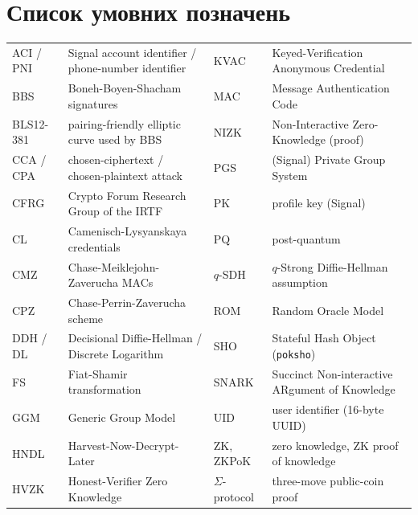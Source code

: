 \documentclass{article}
\begin{document}
\section*{Список умовних позначень}
{}
\begingroup
\small
\renewcommand{\arraystretch}{1.05}
\noindent
\begin{tabularx}{\linewidth}{@{}l X l X@{}}
  \toprule
  ACI / PNI & Signal account identifier / phone-number identifier & KVAC              & Keyed-Verification Anonymous Credential        \\
  BBS       & Boneh-Boyen-Shacham signatures                      & MAC               & Message Authentication Code                    \\
  BLS12-381 & pairing-friendly elliptic curve used by BBS         & NIZK              & Non-Interactive Zero-Knowledge (proof)         \\
  CCA / CPA & chosen-ciphertext / chosen-plaintext attack         & PGS               & (Signal) Private Group System                  \\
  CFRG      & Crypto Forum Research Group of the IRTF             & PK                & profile key (Signal)                           \\
  CL        & Camenisch-Lysyanskaya credentials                   & PQ                & post-quantum                                   \\
  CMZ       & Chase-Meiklejohn-Zaverucha MACs                     & $q$-SDH           & $q$-Strong Diffie-Hellman assumption           \\
  CPZ       & Chase-Perrin-Zaverucha scheme                       & ROM               & Random Oracle Model                            \\
  DDH / DL  & Decisional Diffie-Hellman / Discrete Logarithm      & SHO               & Stateful Hash Object (\texttt{poksho})         \\
  FS        & Fiat-Shamir transformation                          & SNARK             & Succinct Non-interactive ARgument of Knowledge \\
  GGM       & Generic Group Model                                 & UID               & user identifier (16-byte UUID)                 \\
  HNDL      & Harvest-Now-Decrypt-Later                           & ZK, ZKPoK         & zero knowledge, ZK proof of knowledge          \\
  HVZK      & Honest-Verifier Zero Knowledge                      & $\Sigma$-protocol & three-move public-coin proof                   \\
  \bottomrule
\end{tabularx}
\endgroup
\clearpage



\renewcommand*{\mkbibacro}[1]{#1}
\DeclareFieldFormat{url}{\href{#1}{\mkbibacro{(URL)}}}
\newpage
{}
\printbibliography[heading=bibintoc, title={Список літературних джерел}]
\end{document}

